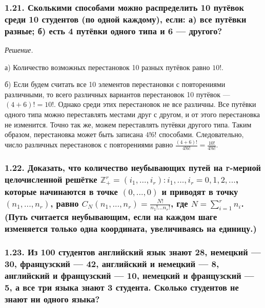 \documentclass{book}
\begin{document}
\subsubsection*{1.21. Сколькими способами можно распределить 10 путёвок среди 10 студентов (по одной каждому), если: а) все путёвки разные; б) есть 4 путёвки одного типа и 6 --- другого?}

\textit{Решение.}

а) Количество возможных перестановок 10 разных путёвок равно $10!$.

б) Если будем считать все 10 элементов перестановки с повторениями различными, то всего различных вариантов перестановок 10 путёвок --- $(4+6)!=10!$. Однако среди этих перестановок не все различны. Все путёвки одного типа можно переставлять местами друг с другом, и от этого перестановка не изменится. Точно так же, можем переставлять путёвки другого типа. Таким образом, перестановка может быть записана $4!6!$ способами. Следовательно, число различных перестановок с повторениями равно $\frac{(4+6)!}{4!6!}=\frac{10!}{4!6!}$.

\subsubsection*{1.22. Доказать, что количество неубывающих путей на r-мерной целочисленной решётке $\mathbb{Z}_+^r={\left(i_1, ..., i_r\right): i_1, ..., i_r=0, 1, 2, ...}$, которые начинаются в точке $\left(0, ..., 0\right)$ и приводят в точку $\left(n_1, ..., n_r\right)$, равно $C_N\left(n_1, ..., n_r\right)=\frac{N!}{n_1!...n_r!}$, где $N=\sum\limits_{i=1}^rn_i$. (Путь считается неубывающим, если на каждом шаге изменяется только одна координата, увеличиваясь на единицу.)}

\subsubsection*{1.23. Из 100 студентов английский язык знают 28, немецкий --- 30, французский --- 42, английский и немецкий --- 8, английский и французский --- 10, немецкий и французский --- 5, а все три языка знают 3 студента. Сколько студентов не знают ни одного языка?}
\end{document}
